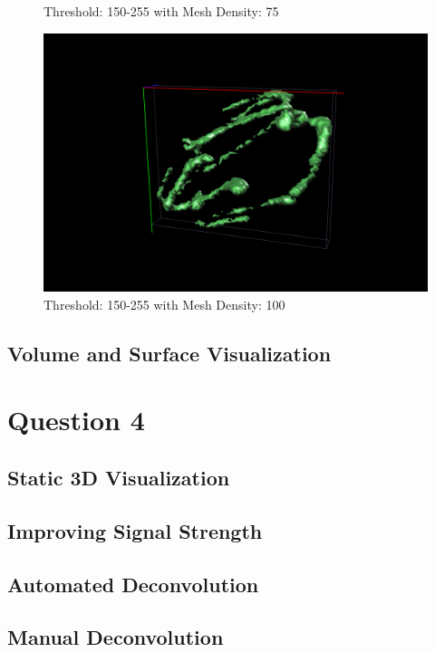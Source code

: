 \documentclass{article}
\begin{document}
\begin{figure}[ht]
\begin{minipage}[b]{0.5\linewidth}
    \captionsetup{width=.8\linewidth}
    \caption{Threshold: 150-255 with Mesh Density: 75}
    \label{fig:150255_75}
    \vspace{4ex}
  \end{minipage}%
  \begin{minipage}[b]{0.5\linewidth}
    \centering
    \includegraphics[width=.8\linewidth]{Report/Images/6.3.2/150-255_100.png}
    \captionsetup{width=.8\linewidth}
    \caption{Threshold: 150-255 with Mesh Density: 100}
    \label{fig:150255_100}
    \vspace{4ex}
  \end{minipage} 
\end{figure}




\subsection*{Volume and Surface Visualization}

\section*{Question 4}
\subsection*{Static 3D Visualization}
\subsection*{Improving Signal Strength}
\subsection*{Automated Deconvolution}
\subsection*{Manual Deconvolution}
\end{document}
